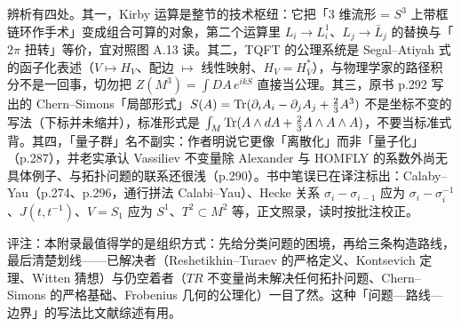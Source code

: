 {辨析有四处。其一，Kirby 运算是整节的技术枢纽：它把「3 维流形 = $S^3$ 上带框链环作手术」变成组合可算的对象，第二个运算里 $L_i\to L_i^1$、$L_j\to\bar L_j$ 的替换与「$2\pi$ 扭转」等价，宜对照图 A.13 读。其二，TQFT 的公理系统是 Segal--Atiyah 式的函子化表述（$V\mapsto H_V$、配边 $\mapsto$ 线性映射、$H_V=H_{\bar V}^*$），与物理学家的路径积分不是一回事，切勿把 $Z(M^3)=\int DA\,e^{ikS}$ 直接当公理。其三，原书 p.292 写出的 Chern--Simons「局部形式」$S(A)=\operatorname{Tr}(\partial_iA_i-\partial_jA_j+\frac23A^3)$ 不是坐标不变的写法（下标并未缩并），标准形式是 $\int_M\operatorname{Tr}(A\wedge dA+\frac23A\wedge A\wedge A)$，不要当标准式背。其四，「量子群」名不副实：作者明说它更像「离散化」而非「量子化」（p.287），并老实承认 Vassiliev 不变量除 Alexander 与 HOMFLY 的系数外尚无具体例子、与拓扑问题的联系还很浅（p.290）。书中笔误已在译注标出：Calaby--Yau（p.274、p.296，通行拼法 Calabi--Yau）、Hecke 关系 $\sigma_i-\sigma_{i-1}$ 应为 $\sigma_i-\sigma_i^{-1}$、$J(t,t^{-1})$、$V=S_1$ 应为 $S^1$、$T^2\subset M^2$ 等，正文照录，读时按批注校正。

评注：本附录最值得学的是组织方式：先给分类问题的困境，再给三条构造路线，最后清楚划线——已解决者（Reshetikhin--Turaev 的严格定义、Kontsevich 定理、Witten 猜想）与仍空着者（$TR$ 不变量尚未解决任何拓扑问题、Chern--Simons 的严格基础、Frobenius 几何的公理化）一目了然。这种「问题—路线—边界」的写法比文献综述有用。
}

